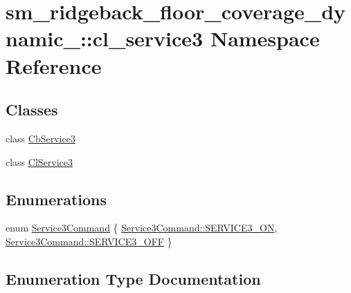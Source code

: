 \hypertarget{namespacesm__ridgeback__floor__coverage__dynamic__1_1_1cl__service3}{}\section{sm\+\_\+ridgeback\+\_\+floor\+\_\+coverage\+\_\+dynamic\+\_\+:\+:cl\+\_\+service3 Namespace Reference}
\label{namespacesm__ridgeback__floor__coverage__dynamic__1_1_1cl__service3}
\subsection*{Classes}
\begin{DoxyCompactItemize}
\item 
class \hyperlink{classsm__ridgeback__floor__coverage__dynamic__1_1_1cl__service3_1_1CbService3}{Cb\+Service3}
\item 
class \hyperlink{classsm__ridgeback__floor__coverage__dynamic__1_1_1cl__service3_1_1ClService3}{Cl\+Service3}
\end{DoxyCompactItemize}
\subsection*{Enumerations}
\begin{DoxyCompactItemize}
\item 
enum \hyperlink{namespacesm__ridgeback__floor__coverage__dynamic__1_1_1cl__service3_a44063f74ff3bc29b2e2e09b19416e604}{Service3\+Command} \{ \hyperlink{namespacesm__ridgeback__floor__coverage__dynamic__1_1_1cl__service3_a44063f74ff3bc29b2e2e09b19416e604a13cdca48a01bbb44fa8fb35567fbc58e}{Service3\+Command\+::\+S\+E\+R\+V\+I\+C\+E3\+\_\+\+ON}, 
\hyperlink{namespacesm__ridgeback__floor__coverage__dynamic__1_1_1cl__service3_a44063f74ff3bc29b2e2e09b19416e604a642ed22a7f6b816840289b4256116e9e}{Service3\+Command\+::\+S\+E\+R\+V\+I\+C\+E3\+\_\+\+O\+FF}
 \}
\end{DoxyCompactItemize}


\subsection{Enumeration Type Documentation}
\mbox{\label{namespacesm__ridgeback__floor__coverage__dynamic__1_1_1cl__service3_a44063f74ff3bc29b2e2e09b19416e604}} 
